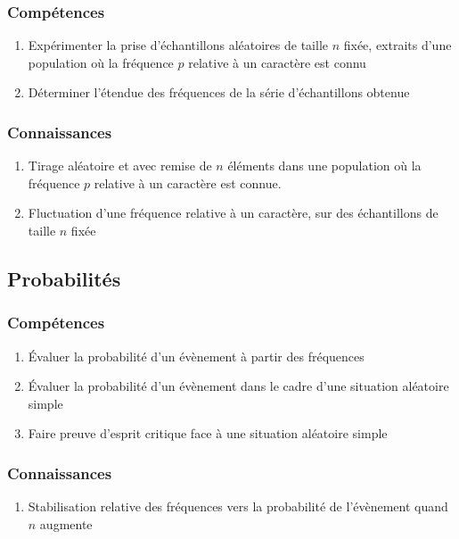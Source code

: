 \documentclass[12pt,a4paper]{article}
\begin{document}
\begin{multicols}{2}
\subsubsection*{Compétences}
\begin{enumerate}
	\item Expérimenter la prise d'échantillons aléatoires de taille $n$ fixée, extraits d'une population où la fréquence $p$ relative à un caractère est connu
	\item Déterminer l'étendue des fréquences de la série d'échantillons obtenue
\end{enumerate}

\subsubsection*{Connaissances}
\begin{enumerate}
	\item Tirage aléatoire  et avec remise de $n$ éléments dans une population où la fréquence $p$ relative à un caractère est connue.
	\item Fluctuation d'une fréquence relative à un caractère, sur des échantillons de taille $n$ fixée
\end{enumerate}
\end{multicols}


\subsection{Probabilités}
\begin{multicols}{2}
	\subsubsection*{Compétences}
	\begin{enumerate}
		\item Évaluer la probabilité d'un évènement à partir des fréquences
		\item Évaluer la probabilité d'un évènement dans le cadre d'une situation aléatoire simple
		\item Faire preuve d'esprit critique face à une situation aléatoire simple
		\end{enumerate}
		
		\subsubsection*{Connaissances}
		\begin{enumerate}
			\item Stabilisation relative des fréquences vers la probabilité de l'évènement quand $n$ augmente
			\end{enumerate}
\end{multicols}
\end{document}
